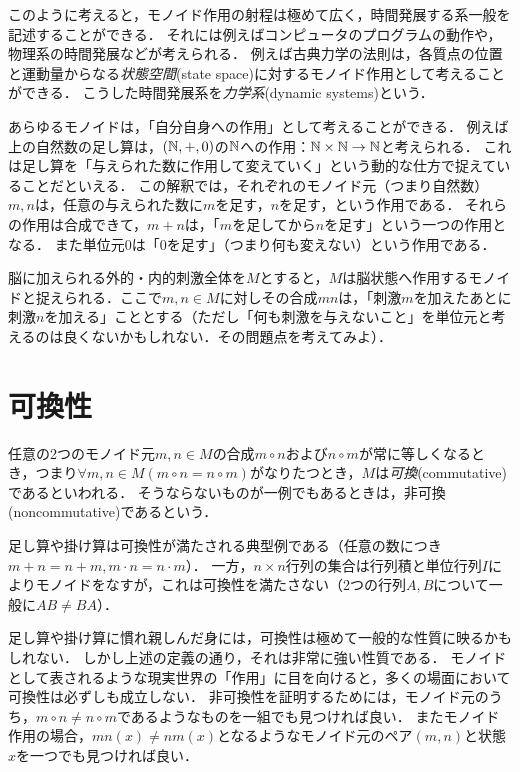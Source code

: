 \documentclass[11pt,a4paper]{jsarticle}
\begin{document}
このように考えると，モノイド作用の射程は極めて広く，時間発展する系一般を記述することができる．
それには例えばコンピュータのプログラムの動作や，物理系の時間発展などが考えられる．
例えば古典力学の法則は，各質点の位置と運動量からなる\emph{状態空間}(state space)に対するモノイド作用として考えることができる．
こうした時間発展系を\emph{力学系}(dynamic systems)という．


\begin{example}
あらゆるモノイドは，「自分自身への作用」として考えることができる．
例えば上の自然数の足し算は，$(\mathbb{N}, +, 0)$の$\mathbb{N}$への作用：$\mathbb{N} \times \mathbb{N} \to \mathbb{N}$と考えられる．
これは足し算を「与えられた数に作用して変えていく」という動的な仕方で捉えていることだといえる．
この解釈では，それぞれのモノイド元（つまり自然数）$m, n$は，任意の与えられた数に$m$を足す，$n$を足す，という作用である．
それらの作用は合成できて，$m+n$は，「$m$を足してから$n$を足す」という一つの作用となる．
また単位元$0$は「$0$を足す」（つまり何も変えない）という作用である．
\end{example}


\begin{example}
    脳に加えられる外的・内的刺激全体を$M$とすると，$M$は脳状態へ作用するモノイドと捉えられる．ここで$m, n \in M$に対しその合成$mn$は，「刺激$m$を加えたあとに刺激$n$を加える」こととする（ただし「何も刺激を与えないこと」を単位元と考えるのは良くないかもしれない．その問題点を考えてみよ）．
\end{example}


\section{可換性}
任意の2つのモノイド元$m,n \in M$の合成$m \circ n$および$n \circ m$が常に等しくなるとき，つまり$\forall m,n \in M (m \circ n = n \circ m)$がなりたつとき，$M$は\emph{可換}(commutative)であるといわれる．
そうならないものが一例でもあるときは，非可換(noncommutative)であるという．

\begin{example}
    足し算や掛け算は可換性が満たされる典型例である（任意の数につき$m+n = n+m, m\cdot n = n\cdot m$）．
    一方，$n \times n$行列の集合は行列積と単位行列$I$によりモノイドをなすが，これは可換性を満たさない（2つの行列$A, B$について一般に$AB \neq BA$）．
\end{example}


足し算や掛け算に慣れ親しんだ身には，可換性は極めて一般的な性質に映るかもしれない．
しかし上述の定義の通り，それは非常に強い性質である．
モノイドとして表されるような現実世界の「作用」に目を向けると，多くの場面において可換性は必ずしも成立しない．
非可換性を証明するためには，モノイド元のうち，$m \circ n \neq n \circ m$であるようなものを一組でも見つければ良い．
またモノイド作用の場合，$mn(x) \neq nm(x)$となるようなモノイド元のペア$(m,n)$と状態$x$を一つでも見つければ良い．
\end{document}
